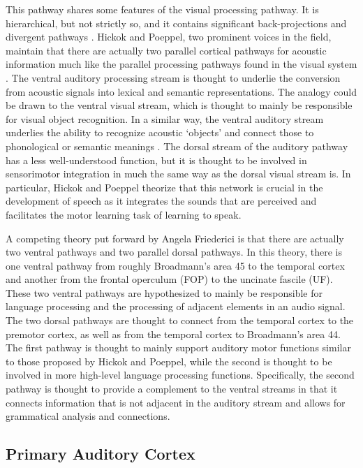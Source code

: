 \documentclass[titlepage]{article}
\begin{document}
  This pathway shares some features of the visual processing pathway. It is hierarchical, but not strictly so,
  and it contains significant back-projections and divergent pathways \cite{Webster1992,Hickok2007}.
  Hickok and Poeppel, two prominent voices in the field, maintain that there are actually two parallel cortical
  pathways for acoustic information much like the parallel processing pathways found in the visual system
  \cite{Hickok2007,Hickok2004,Hickok2000}. The ventral auditory processing stream is thought to underlie
  the conversion from acoustic signals into lexical and semantic representations. The analogy could be drawn
  to the ventral visual stream, which is thought to mainly be responsible for visual object recognition. In
  a similar way, the ventral auditory stream underlies the ability to recognize acoustic `objects' and
  connect those to phonological or semantic meanings \cite{Parker2005,Rauschecker2009}.
  The dorsal stream of the auditory pathway has a less well-understood function, but it is thought to be
  involved in sensorimotor integration in much the same way as the dorsal visual stream is. In particular,
  Hickok and Poeppel theorize that this network is crucial in the development of speech as it integrates the
  sounds that are perceived and facilitates the motor learning task of learning to speak.

  A competing theory
  put forward by Angela Friederici \cite{Friederici2011} is that there are actually two ventral pathways and
  two parallel dorsal pathways. In this theory, there is one ventral pathway from roughly Broadmann's area 45
  to the temporal cortex and another from the frontal operculum (FOP) to the uncinate fascile (UF).
  These two ventral pathways are hypothesized to mainly be responsible for language processing and the
  processing of adjacent elements in an audio signal. The two dorsal pathways are thought to connect from the
  temporal cortex to the premotor cortex, as well as from the temporal cortex to Broadmann's area 44. The first
  pathway is thought to mainly support auditory motor functions similar to those proposed by Hickok and Poeppel,
  while the second is thought to be involved in more high-level language processing functions. Specifically, the
  second pathway is thought to provide a complement to the ventral streams in that it connects information that
  is not adjacent in the auditory stream and allows for grammatical analysis and connections.

  \subsection{Primary Auditory Cortex} \label{primaryAuditoryCortex}
\end{document}
